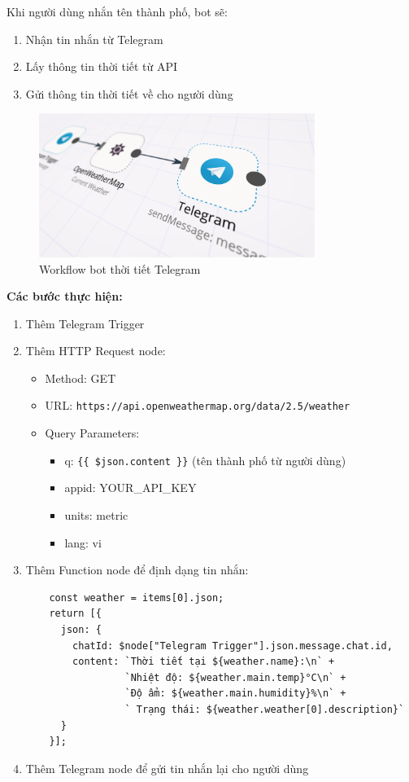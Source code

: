Khi người dùng nhắn tên thành phố, bot sẽ:
\begin{enumerate}
    \item Nhận tin nhắn từ Telegram
    \item Lấy thông tin thời tiết từ API
    \item Gửi thông tin thời tiết về cho người dùng
\end{enumerate}

\begin{figure}[htbp]
    \centering
    \includegraphics[width=0.8\textwidth]{Chap1-7/tele-weather.pdf}
    \caption{Workflow bot thời tiết Telegram}
\end{figure}

\textbf{Các bước thực hiện:}
\begin{enumerate}
    \item Thêm Telegram Trigger
    \item Thêm HTTP Request node:
    \begin{itemize}
        \item Method: GET
        \item URL: \verb|https://api.openweathermap.org/data/2.5/weather|
        \item Query Parameters:
        \begin{itemize}
            \item q: \verb|{{ $json.content }}| (tên thành phố từ người dùng)
            \item appid: YOUR\_API\_KEY
            \item units: metric
            \item lang: vi
        \end{itemize}
    \end{itemize}
    \item Thêm Function node để định dạng tin nhắn:
    \begin{verbatim}
    const weather = items[0].json;
    return [{
      json: {
        chatId: $node["Telegram Trigger"].json.message.chat.id,
        content: `Thời tiết tại ${weather.name}:\n` +
                 `Nhiệt độ: ${weather.main.temp}°C\n` +
                 `Độ ẩm: ${weather.main.humidity}%\n` +
                 ` Trạng thái: ${weather.weather[0].description}`
      }
    }];
    \end{verbatim}
    \item Thêm Telegram node để gửi tin nhắn lại cho người dùng
\end{enumerate}

